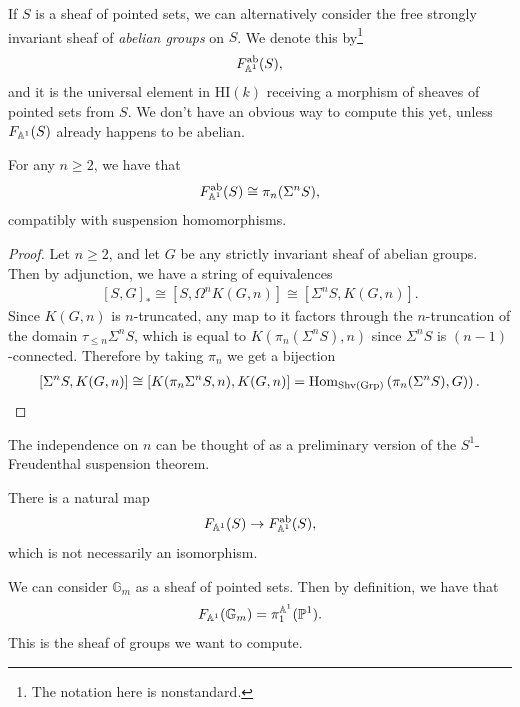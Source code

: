 \documentclass[11pt,openany]{book}
\providecommand{\HI}{\mathrm{HI}}
\begin{document}
\begin{definition} If $S$ is a sheaf of pointed sets, we can alternatively consider the free strongly invariant sheaf of \textit{abelian groups} on $S$. We denote this by\footnote{%
The notation here is nonstandard.}
\begin{align*}
    F_{\mathbb{A}^1}^{\mathrm{ab}}(S),
\end{align*}
and it is the universal element in $\HI(k)$ receiving a morphism of sheaves of pointed sets from $S$. We don't have an obvious way to compute this yet, unless $F_{\mathbb{A}^1}(S)$ already happens to be abelian.
\end{definition}

\begin{proposition} For any $n\ge 2$, we have that 
\begin{align*}
    F_{\mathbb{A}^1}^{\mathrm{ab}}(S) \cong \pi_n(\Sigma^n S),
\end{align*}
compatibly with suspension homomorphisms.
\end{proposition}
\begin{proof} Let $n \ge 2$, and let $G$ be any strictly invariant sheaf of abelian groups. Then by adjunction, we have a string of equivalences
\begin{align*}
    \left[ S,G \right]_\ast \cong \left[ S, \Omega^n K(G,n) \right] \cong \left[ \Sigma^n S, K(G,n) \right].
\end{align*}
Since $K(G,n)$ is $n$-truncated, any map to it factors through the $n$-truncation of the domain $\tau_{\le n} \Sigma^n S$, which is equal to $K(\pi_n(\Sigma^n S),n)$ since $\Sigma^n S$ is $(n-1)$-connected. Therefore by taking $\pi_n$ we get a bijection
\begin{align*}
    \left[ \Sigma^n S, K(G,n) \right] \cong \left[ K(\pi_n \Sigma^n S , n), K(G,n) \right] = \mathrm{Hom}_{\mathrm{Shv}(\mathrm{Grp})} \left( \pi_n(\Sigma^n S), G) \right).
\end{align*}
\end{proof}


The independence on $n$ can be thought of as a preliminary version of the $S^1$-Freudenthal suspension theorem.


\begin{remark} There is a natural map
\begin{align*}
    F_{\mathbb{A}^1}(S) \to F_{\mathbb{A}^1}^{\mathrm{ab}}(S),
\end{align*}
which is not necessarily an isomorphism.
\end{remark}


\begin{example} We can consider $\mathbb{G}_m$ as a sheaf of pointed sets. Then by definition, we have that
\begin{align*}
    F_{\mathbb{A}^1}(\mathbb{G}_m) = \pi_1^{\mathbb{A}^1}(\mathbb{P}^1).
\end{align*}
This is the sheaf of groups we want to compute.
\end{example}
\end{document}
